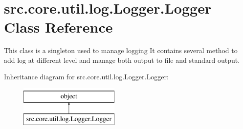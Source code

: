 \hypertarget{classsrc_1_1core_1_1util_1_1log_1_1Logger_1_1Logger}{\section{src.\-core.\-util.\-log.\-Logger.\-Logger Class Reference}
\label{classsrc_1_1core_1_1util_1_1log_1_1Logger_1_1Logger}
}


This class is a singleton used to manage logging It contains several method to add log at different level and manage both output to file and standard output.  


Inheritance diagram for src.\-core.\-util.\-log.\-Logger.\-Logger\-:\begin{figure}[H]
\begin{center}
\leavevmode
\includegraphics[height=2.000000cm]{classsrc_1_1core_1_1util_1_1log_1_1Logger_1_1Logger}
\end{center}
\end{figure}

